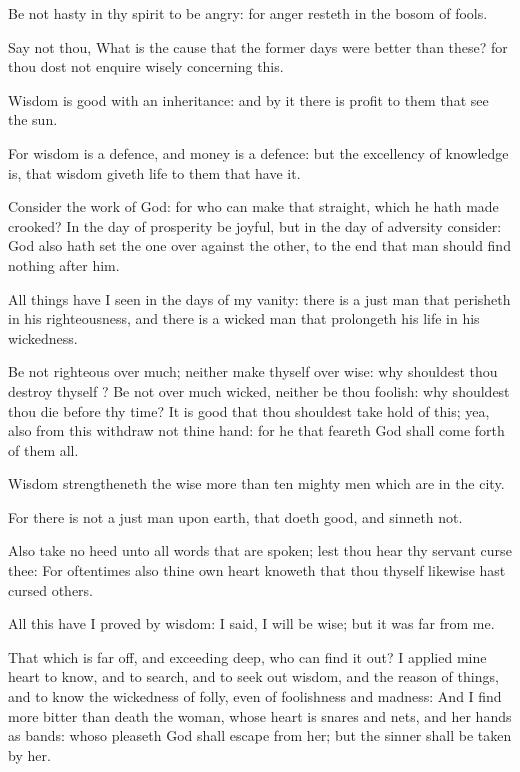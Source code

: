 \verse Be not hasty in thy spirit to be angry: for anger resteth in the bosom of fools.

\verse Say not thou, What is the cause that the former days were better than these? for thou dost not enquire wisely concerning this.

\verse Wisdom is good with an inheritance: and by it there is profit to them that see the sun.

\verse For wisdom is a defence, and money is a defence: but the excellency of knowledge is, that wisdom giveth life to them that have it.

\verse Consider the work of God: for who can make that straight, which he hath made crooked?  \verse In the day of prosperity be joyful, but in the day of adversity consider: God also hath set the one over against the other, to the end that man should find nothing after him.

\verse All things have I seen in the days of my vanity: there is a just man that perisheth in his righteousness, and there is a wicked man that prolongeth his life in his wickedness.

\verse Be not righteous over much; neither make thyself over wise: why shouldest thou destroy thyself ?  \verse Be not over much wicked, neither be thou foolish: why shouldest thou die before thy time?  \verse It is good that thou shouldest take hold of this; yea, also from this withdraw not thine hand: for he that feareth God shall come forth of them all.

\verse Wisdom strengtheneth the wise more than ten mighty men which are in the city.

\verse For there is not a just man upon earth, that doeth good, and sinneth not.

\verse Also take no heed unto all words that are spoken; lest thou hear thy servant curse thee: \verse For oftentimes also thine own heart knoweth that thou thyself likewise hast cursed others.

\verse All this have I proved by wisdom: I said, I will be wise; but it was far from me.

\verse That which is far off, and exceeding deep, who can find it out?  \verse I applied mine heart to know, and to search, and to seek out wisdom, and the reason of things, and to know the wickedness of folly, even of foolishness and madness: \verse And I find more bitter than death the woman, whose heart is snares and nets, and her hands as bands: whoso pleaseth God shall escape from her; but the sinner shall be taken by her.

